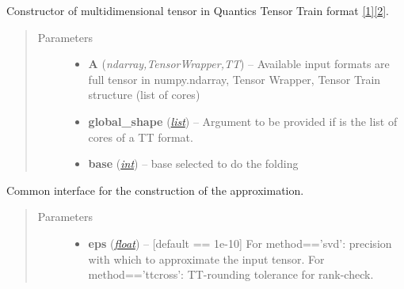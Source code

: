 \documentclass[a4paper,10pt,english]{sphinxmanual}
\begin{document}
\begin{fulllineitems}
\label{api-qttvec:TensorToolbox.core.QTTvec}
Constructor of multidimensional tensor in Quantics Tensor Train format {\hyperref[zrefs:khoromskij2010]{{[}1{]}}}{\hyperref[zrefs:khoromskij2011]{{[}2{]}}}.
\begin{quote}\begin{description}
\item[{Parameters}] \leavevmode\begin{itemize}
\item {} 
\textbf{A} (\emph{ndarray,TensorWrapper,TT}) -- Available input formats are full tensor in numpy.ndarray, Tensor Wrapper, Tensor Train structure (list of cores)

\item {} 
\textbf{global\_shape} (\href{http://docs.python.org/library/functions.html\#list}{\emph{list}}) -- Argument to be provided if  is the list of cores of a TT format.

\item {} 
\textbf{base} (\href{http://docs.python.org/library/functions.html\#int}{\emph{int}}) -- base selected to do the folding

\end{itemize}

\end{description}\end{quote}

\begin{fulllineitems}
\label{api-qttvec:TensorToolbox.core.QTTvec.build}
Common interface for the construction of the approximation.
\begin{quote}\begin{description}
\item[{Parameters}] \leavevmode\begin{itemize}
\item {} 
\textbf{eps} (\href{http://docs.python.org/library/functions.html\#float}{\emph{float}}) -- {[}default == 1e-10{]} For method=='svd': precision with which to approximate the input tensor. For method=='ttcross': TT-rounding tolerance for rank-check.


\end{itemize}
\end{description}
\end{quote}
\end{fulllineitems}
\end{fulllineitems}
\end{document}

